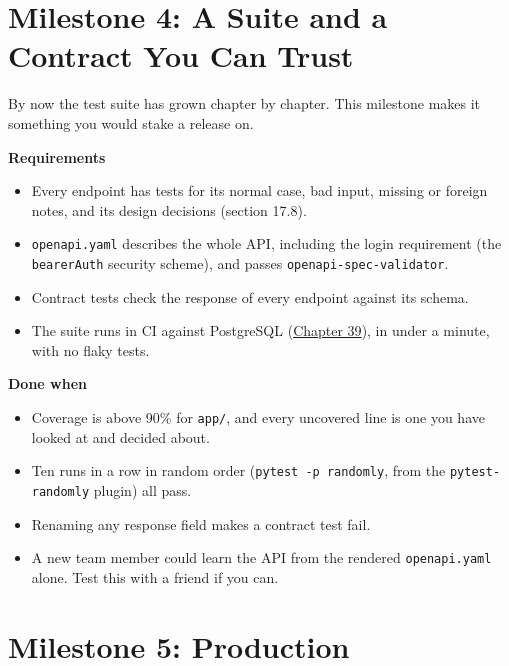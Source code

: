 \setcounter{section}{4}
\section{Milestone 4: A Suite and a Contract You Can Trust}\label{44-project-notes-for-many-users:445-milestone-4-a-suite-and-a-contract-you-can-trust}

By now the test suite has grown chapter by chapter. This milestone makes it something you would stake a release on.

\textbf{Requirements}

\begin{itemize}
\tightlist
\item
  Every endpoint has tests for its normal case, bad input, missing or foreign notes, and its design decisions (section 17.8).
\item
  \texttt{openapi.yaml} describes the whole API, including the login requirement (the \texttt{bearerAuth} security scheme), and passes \texttt{openapi-spec-validator}.
\item
  Contract tests check the response of every endpoint against its schema.
\item
  The suite runs in CI against PostgreSQL (\hyperref[ch:39-local-vs-production]{Chapter 39}), in under a minute, with no flaky tests.
\end{itemize}

\noindent{}\textbf{Done when}

\begin{itemize}
\item[$\square$]
  Coverage is above 90\% for \texttt{app/}, and every uncovered line is one you have looked at and decided about.
\item[$\square$]
  Ten runs in a row in random order (\texttt{pytest\ -p\ randomly}, from the \texttt{pytest-randomly} plugin) all pass.
\item[$\square$]
  Renaming any response field makes a contract test fail.
\item[$\square$]
  A new team member could learn the API from the rendered \texttt{openapi.yaml} alone. Test this with a friend if you can.
\end{itemize}

\setcounter{section}{5}
\section{Milestone 5: Production}\label{44-project-notes-for-many-users:446-milestone-5-production}

